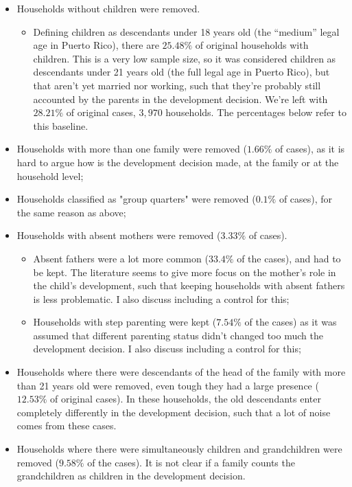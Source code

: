 \documentclass[12pt]{article}
\begin{document}
\begin{itemize}
    \item Households without children were removed.
    \begin{itemize}
        \item Defining children as descendants under 18 years old (the ``medium'' legal age in Puerto Rico), there are $25.48\%$ of original households with children. This is a very low sample size, so it was considered children as descendants under 21 years old (the full legal age in Puerto Rico), but that aren't yet married nor working, such that they're probably still accounted by the parents in the development decision. We're left with $28.21\%$ of original cases, $3,970$ households. The percentages below refer to this baseline.
    \end{itemize}
    \item Households with more than one family were removed ($1.66\%$ of cases), as it is hard to argue how is the development decision made, at the family or at the household level;
    \item Households classified as "group quarters" were removed ($0.1\%$ of cases), for the same reason as above;
    \item Households with absent mothers were removed ($3.33\%$ of cases).
    \begin{itemize}
        \item Absent fathers were a lot more common ($33.4\%$ of the cases), and had to be kept. The literature seems to give more focus on the mother's role in the child's development, such that keeping households with absent fathers is less problematic. I also discuss including a control for this;
        \item Households with step parenting were kept ($7.54\%$ of the cases) as it was assumed that different parenting status didn't changed too much the development decision. I also discuss including a control for this;
    \end{itemize}
    \item Households where there were descendants of the head of the family with more than 21 years old were removed, even tough they had a large presence ($12.53\%$ of original cases). In these households, the old descendants enter completely differently in the development decision, such that a lot of noise comes from these cases.
    \item Households where there were simultaneously children and grandchildren were removed ($9.58\%$ of the cases). It is not clear if a family counts the grandchildren as children in the development decision.
\end{itemize}
\end{document}
